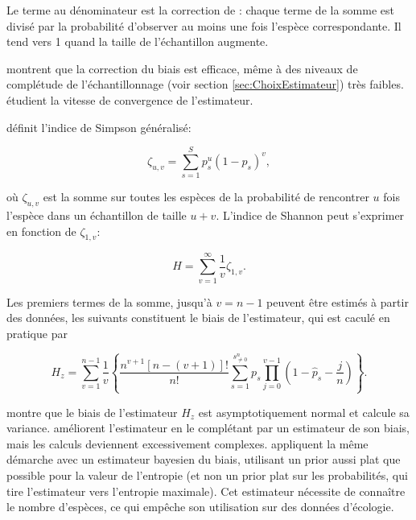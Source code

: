 \documentclass[
  11pt,
  french,
  a4paper,
  extrafontsizes,onecolumn,openright
  ]{memoir}
\begin{document}
Le terme au dénominateur est la correction de \textcite{Horvitz1952}: chaque terme de la somme est divisé par la probabilité d'observer au moins une fois l'espèce correspondante.
Il tend vers 1 quand la taille de l'échantillon augmente.

\textcite{Beck2010} montrent que la correction du biais est efficace, même à des niveaux de complétude de l'échantillonnage (voir section \ref{sec:ChoixEstimateur}) très faibles. \textcite{Vu2007} étudient la vitesse de convergence de l'estimateur.

\textcite{Zhang2012} définit l'indice de Simpson généralisé:

\begin{equation}
  \label{eq:zeta}
  \zeta_{u,v} = \sum^S_{s=1}{p^u_s{\left(1-p_s\right)}^v},
\end{equation}

où \(\zeta_{u,v}\) est la somme sur toutes les espèces de la probabilité de rencontrer \(u\) fois l'espèce dans un échantillon de taille \(u+v\).
L'indice de Shannon peut s'exprimer en fonction de \(\zeta_{1,v}\):

\begin{equation}
  \label{eq:HzetaInf}
  H = \sum^{\infty}_{v=1}{\frac{1}{v} \zeta_{1,v}}.
\end{equation}

Les premiers termes de la somme, jusqu'à \(v=n-1\) peuvent être estimés à partir des données, les suivants constituent le biais de l'estimateur, qui est caculé en pratique par

\begin{equation}
  \label{eq:Hzetanu}
  H_z = \sum^{n-1}_{v=1}{\frac{1}{v}\left\{\frac{n^{v+1}\left[n-\left(v+1\right)\right]!}{n!}\sum^{s^{n}_{\ne 0}}_{s=1}{p_s\prod^{v-1}_{j=0}{\left(1-{\hat{p}}_s-\frac{j}{n}\right)}}\right\}}.
\end{equation}

\textcite{Zhang2013a} montre que le biais de l'estimateur \(H_z\) est asymptotiquement normal et calcule sa variance.
\textcite{Zhang2013} améliorent l'estimateur en le complétant par un estimateur de son biais, mais les calculs deviennent excessivement complexes.
\textcite{Vinck2012} appliquent la même démarche avec un estimateur bayesien du biais, utilisant un prior aussi plat que possible pour la valeur de l'entropie (et non un prior plat sur les probabilités, qui tire l'estimateur vers l'entropie maximale).
Cet estimateur nécessite de connaître le nombre d'espèces, ce qui empêche son utilisation sur des données d'écologie.
\end{document}
